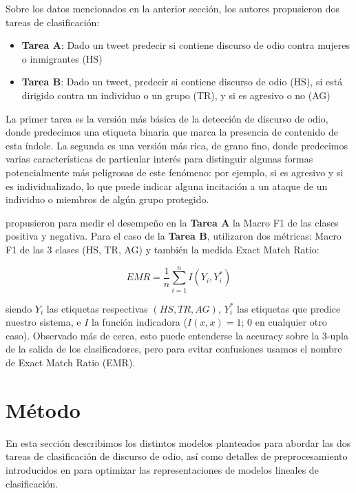 Sobre los datos mencionados en la anterior sección, los autores propusieron dos tareas de clasificación:

\newcommand{\subtaska}[0]{\textbf{Tarea A}}
\newcommand{\subtaskb}[0]{\textbf{Tarea B}}

\begin{itemize}
    \item \subtaska{}: Dado un tweet predecir si contiene discurso de odio contra mujeres o inmigrantes (HS)
    \item \subtaskb{}: Dado un tweet, predecir si contiene discurso de odio (HS), si está dirigido contra un individuo o un grupo (TR), y si es agresivo o no (AG)
\end{itemize}


La primer tarea es la versión más básica de la detección de discurso de odio, donde predecimos una etiqueta binaria que marca la presencia de contenido de esta índole. La segunda es una versión más rica, de grano fino, donde predecimos varias características de particular interés para distinguir algunas formas potencialmente más peligrosas de este fenómeno: por ejemplo, si es agresivo y si es individualizado, lo que puede indicar alguna incitación a un ataque de un individuo o miembros de algún grupo protegido.

\citet{hateval2019semeval} propusieron para medir el desempeño en la \subtaska{} la Macro F1 de las clases positiva y negativa. Para el caso de la \subtaskb{}, utilizaron dos métricas: Macro F1 de las 3 clases (HS, TR, AG) y también la medida Exact Match Ratio:

\begin{equation*}
    EMR = \frac{1}{n} \sum\limits_{i=1}^{n} I(Y_i, Y_i^*)
\end{equation*}

\noindent siendo $Y_i$ las etiquetas respectivas $(HS, TR, AG)$, $Y_i^*$ las etiquetas que predice nuestro sistema, e  $I$ la función indicadora ($I(x, x) = 1$; $0$ en cualquier otro caso). Observado más de cerca, esto puede entenderse la accuracy sobre la 3-upla de la salida de los clasificadores, pero para evitar confusiones usamos el nombre de Exact Match Ratio (EMR). \cite{zhang-2014-multilabel}

\section{Método}

En esta sección describimos los distintos modelos planteados para abordar las dos tareas de clasificación de discurso de odio, así como detalles de preprocesamiento introducidos en \citet{perez-2019-atalaya} para optimizar las representaciones de modelos lineales de clasificación.

